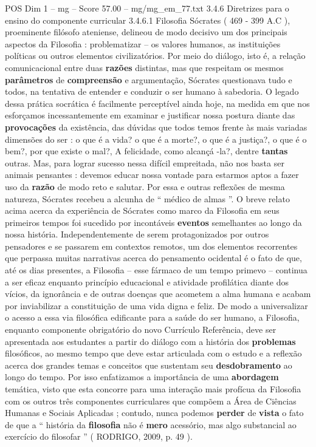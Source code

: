 \begin{textsample}{POS Dim 1 – mg – Score 57.00 – mg/mg\_em\_77.txt}  \label{ex:f1_pos_231}
3.4.6 Diretrizes para o ensino do componente curricular 3.4.6.1 Filosofia Sócrates ( 469 - 399 A.C ), proeminente filósofo ateniense, delineou de modo decisivo um dos principais aspectos da Filosofia : problematizar – os valores humanos, as instituições políticas ou outros elementos civilizatórios.
Por meio do diálogo, isto é, a relação comunicacional entre duas \textbf{razões} distintas, mas que respeitam os mesmos \textbf{parâmetros} de \textbf{compreensão} e argumentação, Sócrates questionava tudo e todos, na tentativa de entender e conduzir o ser humano à sabedoria.
O legado dessa prática socrática é facilmente perceptível ainda hoje, na medida em que nos esforçamos incessantemente em examinar e justificar nossa postura diante das \textbf{provocações} da existência, das dúvidas que todos temos frente às mais variadas dimensões do ser : o que é a vida? o que é a morte?, o que é a justiça?, o que é o bem?, por que existe o mal?, A felicidade, como alcançá -la?, dentre \textbf{tantas} outras.
Mas, para lograr sucesso nessa difícil empreitada, não nos basta ser animais pensantes : devemos educar nossa vontade para estarmos aptos a fazer uso da \textbf{razão} de modo reto e salutar.
Por essa e outras reflexões de mesma natureza, Sócrates recebeu a alcunha de “ médico de almas ”.
O breve relato acima acerca da experiência de Sócrates como marco da Filosofia em seus primeiros tempos foi sucedido por incontáveis \textbf{eventos} semelhantes ao longo da nossa história.
Independentemente de serem protagonizados por outros pensadores e se passarem em contextos remotos, um dos elementos recorrentes que perpassa muitas narrativas acerca do pensamento ocidental é o fato de que, até os dias presentes, a Filosofia – esse fármaco de um tempo primevo – continua a ser eficaz enquanto princípio educacional e atividade profilática diante dos vícios, da ignorância e de outras doenças que acometem a alma humana e acabam por inviabilizar a constituição de uma vida digna e feliz.
De modo a universalizar o acesso a essa via filosófica edificante para a saúde do ser humano, a Filosofia, enquanto componente obrigatório do novo Currículo Referência, deve ser apresentada aos estudantes a partir do diálogo com a história dos \textbf{problemas} filosóficos, ao mesmo tempo que deve estar articulada com o estudo e a reflexão acerca dos grandes temas e conceitos que sustentam seu \textbf{desdobramento} ao longo do tempo.
Por isso enfatizamos a importância de uma \textbf{abordagem} temática, visto que esta concorre para uma interação mais profícua da Filosofia com os outros três componentes curriculares que compõem a Área de Ciências Humanas e Sociais Aplicadas ; contudo, nunca podemos \textbf{perder} de \textbf{vista} o fato de que a “ história da \textbf{filosofia} não é \textbf{mero} acessório, mas algo substancial ao exercício do filosofar ” ( RODRIGO, 2009, p. 49 ).

\end{textsample}

